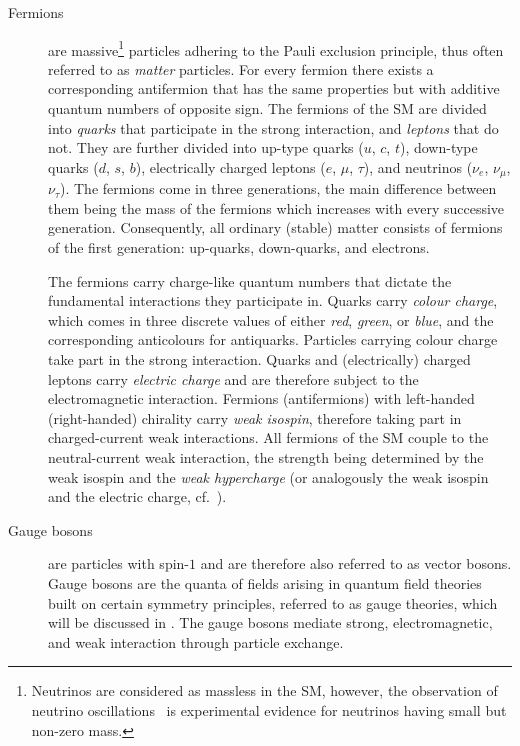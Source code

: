 \begin{description}

\item[Fermions] are massive\footnote{Neutrinos are considered as massless in the
    SM, however, the observation of neutrino
    oscillations~\cite{Super-Kamiokande:1998kpq,SNO:2002tuh} is experimental
    evidence for neutrinos having small but non-zero mass.} particles adhering
  to the Pauli exclusion principle, thus often referred to as \emph{matter}
  particles. For every fermion there exists a corresponding antifermion that has
  the same properties but with additive quantum numbers of opposite sign. The
  fermions of the SM are divided into \emph{quarks} that participate in the
  strong interaction, and \emph{leptons} that do not. They are further divided
  into up-type quarks ($u$, $c$, $t$), down-type quarks ($d$, $s$, $b$),
  electrically charged leptons ($e$, $\mu$, $\tau$), and neutrinos ($\nu_e$,
  $\nu_\mu$, $\nu_\tau$). The fermions come in three generations, the main
  difference between them being the mass of the fermions which increases with
  every successive generation. Consequently, all ordinary (stable) matter
  consists of fermions of the first generation: up-quarks, down-quarks, and
  electrons.

  The fermions carry charge-like quantum numbers that dictate the fundamental
  interactions they participate in. Quarks carry \emph{colour charge}, which
  comes in three discrete values of either \emph{red}, \emph{green}, or
  \emph{blue}, and the corresponding anticolours for antiquarks. Particles
  carrying colour charge take part in the strong interaction. Quarks and
  (electrically) charged leptons carry \emph{electric charge} and are therefore
  subject to the electromagnetic interaction. Fermions (antifermions) with
  left-handed (right-handed) chirality carry \emph{weak isospin}, therefore
  taking part in charged-current weak interactions. All fermions of the SM
  couple to the neutral-current weak interaction, the strength being determined
  by the weak isospin and the \emph{weak hypercharge} (or analogously the weak
  isospin and the electric charge, cf.~).

\item[Gauge bosons] are particles with spin-$1$ and are therefore also referred
  to as vector bosons. Gauge bosons are the quanta of fields arising in quantum
  field theories built on certain symmetry principles, referred to as gauge
  theories, which will be discussed in
  . The gauge bosons mediate strong,
  electromagnetic, and weak interaction through particle exchange.


\end{description}
